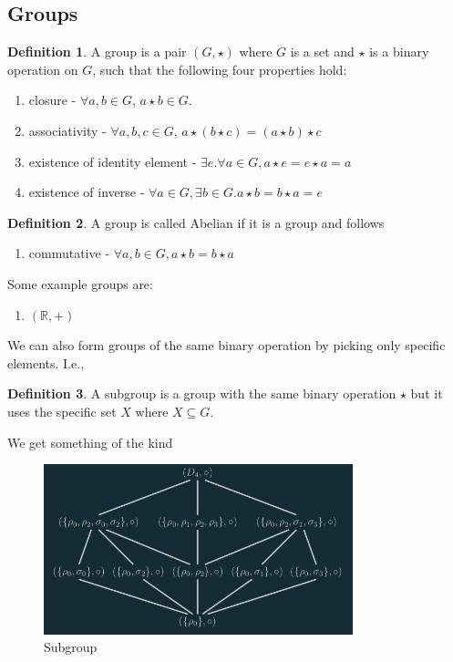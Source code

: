 \documentclass[a4paper]{article}
\theoremstyle{plain}
\theoremstyle{definition}
\newtheorem{defn}{Definition}[section]
\newtheorem{exmp}{Example}[section]
\theoremstyle{remark}
\begin{document}
\subsection{Groups}
\begin{defn}
	A group is a pair $(G, \star)$ where $G$ is a set and $\star$ is a binary operation on $G$, such that the following four properties hold:
	\begin{enumerate}
		\item closure - $\forall a,b \in G$, $a \star b \in G$.
		\item associativity - $\forall a,b,c \in G$, $a \star ( b \star c )  = (a \star b) \star c$
		\item existence of identity element - $\exists e . \forall  a \in G, a \star e = e \star a = a$ 
		\item existence of inverse - $\forall a \in G, \exists  b \in G . a \star b = b \star a = e$
	\end{enumerate}
\end{defn}
\begin{defn}
	A group is called Abelian if it is a group and follows
	\begin{enumerate}
		\item commutative - $\forall a,b \in G, a \star b = b \star a$
	\end{enumerate}
\end{defn}
\begin{tcolorbox}[colback=black!3!white,colframe=black!60!white,title=\begin{exmp}Example of Groups \label{Example of Groups}\end{exmp}]
        Some example groups are:
	\begin{enumerate}
		\item $(\mathbb{R},+)$ 
	\end{enumerate}
\end{tcolorbox}
We can also form groups of the same binary operation by picking only specific elements. I.e.,
\begin{defn}
	A subgroup is a group with the same binary operation $\star$ but it uses the specific set $X$ where $X \subseteq G$.
\end{defn}
We get something of the kind
\begin{figure}[H]
	\centering
	\includegraphics[width=0.8\textwidth]{sub.png}
	\caption{Subgroup}
	\label{fig:sub-png}
\end{figure}
\end{document}
